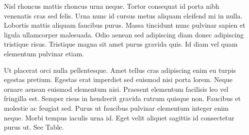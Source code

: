 \documentclass{article}
\begin{document}
 Nisl rhoncus mattis rhoncus urna neque. Tortor consequat id porta nibh venenatis cras sed felis. Urna nunc id cursus metus aliquam eleifend mi in nulla. Lobortis mattis aliquam faucibus purus. Massa tincidunt nunc pulvinar sapien et ligula ullamcorper malesuada. Odio aenean sed adipiscing diam donec adipiscing tristique risus. Tristique magna sit amet purus gravida quis. Id diam vel quam elementum pulvinar etiam.


Ut placerat orci nulla pellentesque. Amet tellus cras adipiscing enim eu turpis egestas pretium. Egestas erat imperdiet sed euismod nisi porta lorem. Neque ornare aenean euismod elementum nisi. Praesent elementum facilisis leo vel fringilla est. Semper risus in hendrerit gravida rutrum quisque non. Faucibus et molestie ac feugiat sed. Purus ut faucibus pulvinar elementum integer enim neque. Morbi tempus iaculis urna id. Eget velit aliquet sagittis id consectetur purus ut. See Table.
\end{document}
